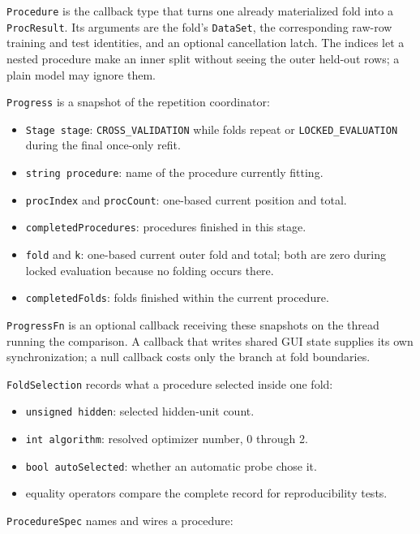 \texttt{Procedure} is the callback type that turns one already materialized
fold into a \texttt{ProcResult}.  Its arguments are the fold's \texttt{DataSet},
the corresponding raw-row training and test identities, and an optional
cancellation latch.  The indices let a nested procedure make an inner split
without seeing the outer held-out rows; a plain model may ignore them.

\texttt{Progress} is a snapshot of the repetition coordinator:

\begin{itemize}
\item \texttt{Stage stage}: \texttt{CROSS\_VALIDATION} while folds repeat or
      \texttt{LOCKED\_EVALUATION} during the final once-only refit.
\item \texttt{string procedure}: name of the procedure currently fitting.
\item \texttt{procIndex} and \texttt{procCount}: one-based current position and total.
\item \texttt{completedProcedures}: procedures finished in this stage.
\item \texttt{fold} and \texttt{k}: one-based current outer fold and total;
      both are zero during locked evaluation because no folding occurs there.
\item \texttt{completedFolds}: folds finished within the current procedure.
\end{itemize}

\texttt{ProgressFn} is an optional callback receiving these snapshots on the
thread running the comparison.  A callback that writes shared GUI state supplies
its own synchronization; a null callback costs only the branch at fold boundaries.

\texttt{FoldSelection} records what a procedure selected inside one fold:

\begin{itemize}
\item \texttt{unsigned hidden}: selected hidden-unit count.
\item \texttt{int algorithm}: resolved optimizer number, 0 through 2.
\item \texttt{bool autoSelected}: whether an automatic probe chose it.
\item equality operators compare the complete record for reproducibility tests.
\end{itemize}

\texttt{ProcedureSpec} names and wires a procedure:

